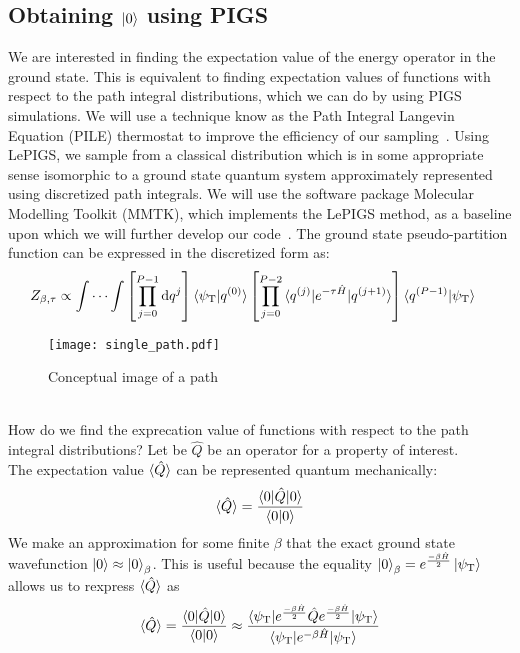 \documentclass[12pt,letterpaper,oneside,final,titlepage]{article}               %
\numberwithin{equation}{section} %
\newcommand{\psiT}{\psi_{\textrm{T}}}
\newcommand{\eBHf}{e^{\frac{-\beta\hat{H}}{2}}}
\newcommand{\eBH}{e^{-\beta\hat{H}}}
\newcommand{\eTH}{e^{-\tau\hat{H}}}
\begin{document}
\subsection{Obtaining $\ket{0}$ using PIGS}
We are interested in finding the expectation value of the energy operator in the ground state. 
This is equivalent to finding expectation values of functions with respect to the path integral distributions, which we can do by using PIGS simulations.
We will use a technique know as the Path Integral Langevin Equation (PILE) thermostat to improve the efficiency of our sampling~\cite{constable2013langevin}.
Using LePIGS, we sample from a classical distribution which is in some appropriate sense isomorphic to a ground state quantum system approximately represented
using discretized path integrals. 
We will use the software package Molecular Modelling Toolkit (MMTK), which implements the LePIGS method, as a baseline upon which we will further develop our code~\cite{hinsen2000molecular}. 
The ground state pseudo-partition function can be expressed in the discretized form as:
\begin{align*}
    Z_{\beta,\tau}
    &\propto \idotsint  \left[ \prod_{j=0}^{P-1} \dif q^{j}                      \right]
                        \braket{\psiT|q^{(0)}}
                        \left[ \prod_{j=0}^{P-2} \braket{q^{(j)}|\eTH|q^{(j+1)}} \right]
                        \braket{q^{(P-1)}|\psiT}
\end{align*}
\begin{figure}[h]
    \texttt{[image: single\_path.pdf]}
    \caption{Conceptual image of a path}
\end{figure} \\
How do we find the exprecation value of functions with respect to the path integral distributions? 
Let be $\hat{Q}$ be an operator for a property of interest. \\
The expectation value $\braket{\hat{Q}}$ can be represented quantum mechanically:
\begin{equation}
    \braket{\hat{Q}} = \frac{\braket{0|\hat{Q}|0}}{\braket{0|0}}
\end{equation}
We make an approximation for some finite $\beta$ that the exact ground state wavefunction $\ket{0} \approx \ket{0}_{\beta}$.
This is useful because the equality $\ket{0}_{\beta} = \eBHf\ket{\psiT}$ allows us to rexpress $\braket{\hat{Q}}$ as
\begin{equation}
    \braket{\hat{Q}} = \frac{\braket{0|\hat{Q}|0}}{\braket{0|0}} \approx \frac{\braket{\psiT|\eBHf\hat{Q}\eBHf|\psiT}} {\braket{\psiT|\eBH|\psiT}} 
\end{equation}
\end{document}
